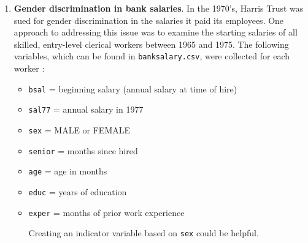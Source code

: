 \documentclass[
]{krantz}
\providecommand{\tightlist}{%
  \setlength{\itemsep}{0pt}\setlength{\parskip}{0pt}}
\begin{document}
\begin{enumerate}
\def\labelenumi{\arabic{enumi}.}
\tightlist
\item
  \textbf{Gender discrimination in bank salaries}. In the 1970's, Harris Trust was sued for gender discrimination in the salaries it paid its employees. One approach to addressing this issue was to examine the starting salaries of all skilled, entry-level clerical workers between 1965 and 1975. The following variables, which can be found in \texttt{banksalary.csv}, were collected for each worker \citep{Ramsey2002}:

  \begin{itemize}
  \tightlist
  \item
    \texttt{bsal} = beginning salary (annual salary at time of hire)
  \item
    \texttt{sal77} = annual salary in 1977
  \item
    \texttt{sex} = MALE or FEMALE
  \item
    \texttt{senior} = months since hired
  \item
    \texttt{age} = age in months
  \item
    \texttt{educ} = years of education
  \item
    \texttt{exper} = months of prior work experience

    Creating an indicator variable based on \texttt{sex} could be helpful.\\
  \end{itemize}


\end{enumerate}
\end{document}
